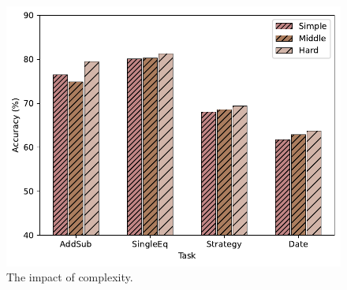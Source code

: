 \documentclass[11pt]{article}
\begin{document}
\begin{figure}[ht]
    \centering
    \includegraphics[width=\linewidth]{pics/complexity.pdf}
    \caption{The impact of complexity.}
    \label{fig:ablation_complexity}
\end{figure}
\end{document}
